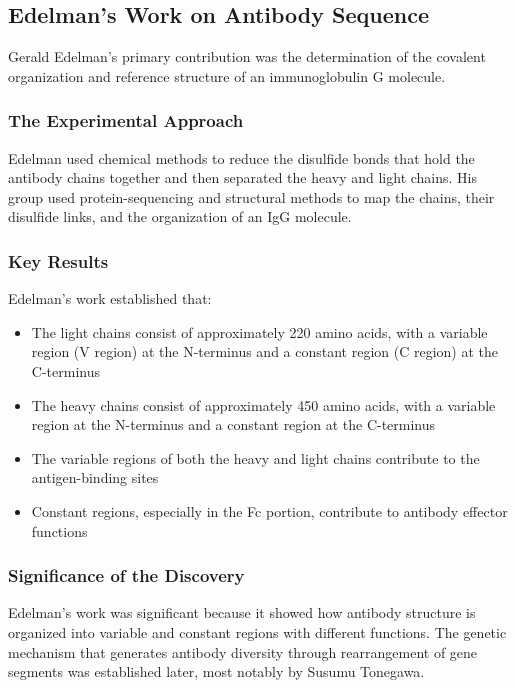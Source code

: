 \subsection{Edelman's Work on Antibody Sequence}

Gerald Edelman's primary contribution was the determination of the covalent organization and reference structure of an immunoglobulin G molecule.

\subsubsection{The Experimental Approach}

Edelman used chemical methods to reduce the disulfide bonds that hold the antibody chains together and then separated the heavy and light chains. His group used protein-sequencing and structural methods to map the chains, their disulfide links, and the organization of an IgG molecule.

\subsubsection{Key Results}

Edelman's work established that:

\begin{itemize}
\item The light chains consist of approximately 220 amino acids, with a variable region (V region) at the N-terminus and a constant region (C region) at the C-terminus
\item The heavy chains consist of approximately 450 amino acids, with a variable region at the N-terminus and a constant region at the C-terminus
\item The variable regions of both the heavy and light chains contribute to the antigen-binding sites
\item Constant regions, especially in the Fc portion, contribute to antibody effector functions
\end{itemize}

\subsubsection{Significance of the Discovery}

Edelman's work was significant because it showed how antibody structure is organized into variable and constant regions with different functions. The genetic mechanism that generates antibody diversity through rearrangement of gene segments was established later, most notably by Susumu Tonegawa.

